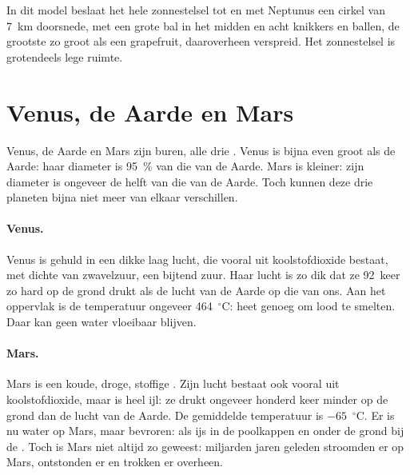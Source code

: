 In dit model beslaat het hele zonnestelsel tot en met Neptunus een cirkel
van 7~km doorsnede, met een grote bal in het midden en acht knikkers en
ballen, de grootste zo groot als een grapefruit, daaroverheen verspreid. Het
zonnestelsel is grotendeels lege ruimte.

\section{Venus, de Aarde en Mars}

Venus, de Aarde en Mars zijn buren, alle drie . Venus is
bijna even groot als de Aarde: haar diameter is 95~\% van die van de
Aarde. Mars is kleiner: zijn diameter is ongeveer de helft van die van de
Aarde. Toch kunnen deze drie planeten bijna niet meer van elkaar
verschillen.

\paragraph{Venus.} Venus is gehuld in een dikke laag lucht, die vooral uit
koolstofdioxide bestaat, met dichte  van zwavelzuur, een bijtend
zuur. Haar lucht is zo dik dat ze 92~keer zo hard op de grond drukt als de
lucht van de Aarde op die van ons. Aan het oppervlak is de temperatuur
ongeveer 464~$^\circ$C: heet genoeg om lood te smelten. Daar kan geen
water vloeibaar blijven.

\paragraph{Mars.} Mars is een koude, droge, stoffige . Zijn lucht
bestaat ook vooral uit koolstofdioxide, maar is heel ijl: ze drukt ongeveer
honderd keer minder op de grond dan de lucht van de Aarde. De gemiddelde
temperatuur is $-65$~$^\circ$C. Er is nu water op Mars, maar bevroren: als
ijs in de poolkappen en onder de grond bij de . Toch is Mars niet
altijd zo geweest: miljarden jaren geleden stroomden er  op Mars,
ontstonden er  en trokken er  overheen.

